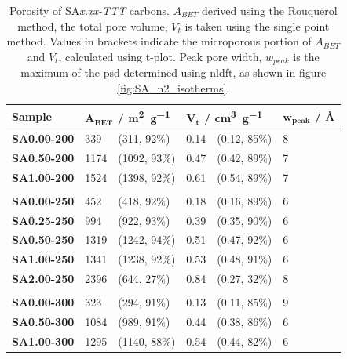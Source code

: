 \begin{table}[t!]
    \centering
    \caption{Porosity of SA\textit{x.xx-TTT} carbons. $A_{BET}$ derived using the Rouquerol method, the total pore volume, $V_t$ is taken using the single point method. Values in brackets indicate the microporous portion of $A_{BET}$ and $V_t$, calculated using t-plot. Peak pore width, $w_{peak}$ is the maximum of the \acrshort{psd} determined using \acrshort{nldft}, as shown in figure \ref{fig:SA_n2_isotherms}.}
    \label{tb:sa_porosity}
    \begin{tabularx}{0.9\textwidth}{lllllll}
    \toprule
        \textbf{Sample} & \multicolumn{2}{l}{$\mathbf{A_{BET}}$ \textbf{/ \unit[detect-weight]{\metre\squared\per\gram}}}  & \multicolumn{2}{l}{$\mathbf{V_t}$ \textbf{/ \unit[detect-weight]{\cm\cubed\per\gram}}} & \multicolumn{2}{l}{$\mathbf{w_{peak}}$ \textbf{/ \unit{\angstrom}}} \\
    \midrule
        \textbf{SA0.00-200} & 339 & (311, 92\%) & 0.14 & (0.12, 85\%) & 8 \\
        \textbf{SA0.50-200} & 1174 & (1092, 93\%) & 0.47 & (0.42, 89\%) & 7 \\
        \textbf{SA1.00-200} & 1524 & (1398, 92\%) & 0.61 & (0.54, 89\%) & 7 \\
        \\
        \textbf{SA0.00-250} & 452 & (418, 92\%) & 0.18 & (0.16, 89\%) & 6 \\
        \textbf{SA0.25-250} & 994 & (922, 93\%) & 0.39 & (0.35, 90\%) & 6 \\
        \textbf{SA0.50-250} & 1319 & (1242, 94\%) & 0.51 & (0.47, 92\%) & 6 \\
        \textbf{SA1.00-250} & 1341 & (1238, 92\%) & 0.53 & (0.48, 91\%) & 6 \\
        \textbf{SA2.00-250} & 2396 & (644, 27\%) & 0.84 & (0.27, 32\%) & 8 \\
        \\
        \textbf{SA0.00-300} & 323 & (294, 91\%) & 0.13 & (0.11, 85\%) & 9 \\
        \textbf{SA0.50-300} & 1084 & (989, 91\%) & 0.44 & (0.38, 86\%) & 6 \\
        \textbf{SA1.00-300} & 1295 & (1140, 88\%) & 0.54 & (0.44, 82\%) & 6 \\
    \bottomrule
    \end{tabularx}
\end{table}

